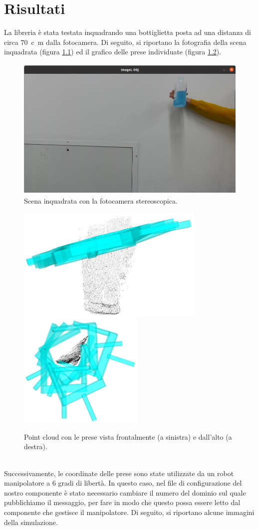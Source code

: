 \documentclass{report}
\begin{document}
\newpage
\chapter{Risultati}\label{risultati}
La libreria è stata testata inquadrando una bottiglietta posta ad una distanza di circa \SI{70}{c\meter} dalla fotocamera. Di seguito, si riportano la fotografia della scena inquadrata (figura \ref{figura:scenalab}) ed il grafico delle prese individuate (figura \ref{figura:preselab}). 
\begin{figure}[h!]
	\centering
	\includegraphics[height=6.9cm]{immagini/lab3}
	\caption{Scena inquadrata con la fotocamera stereoscopica.}
	\label{figura:scenalab}
\end{figure}
\begin{figure}[h!]
	\centering
	\includegraphics[height=5.5cm]{immagini/lab1}
	\includegraphics[height=5.5cm]{immagini/lab2}
	\caption{Point cloud con le prese vista frontalmente (a sinistra) e dall'alto (a destra).}
	\label{figura:preselab}
\end{figure}
\\Successivamente, le coordinate delle prese sono state utilizzate da un robot manipolatore a 6 gradi di libertà. In questo caso, nel file di configurazione del nostro componente è stato necessario cambiare il numero del dominio sul quale pubblichiamo il messaggio, per fare in modo che questo possa essere letto dal componente che gestisce il manipolatore. Di seguito, si riportano alcune immagini della simulazione.
\end{document}
